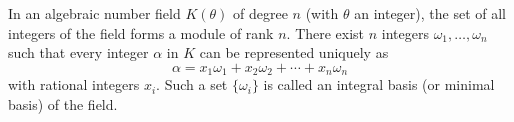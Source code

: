 In an algebraic number field $K(\theta)$ of degree $n$ (with $\theta$ an integer), the set of all integers of the field forms a module of rank $n$. There exist $n$ integers $\omega_1, \ldots, \omega_n$ such that every integer $\alpha$ in $K$ can be represented uniquely as
$$\alpha = x_1 \omega_1 + x_2 \omega_2 + \cdots + x_n \omega_n$$
with rational integers $x_i$. Such a set $\{\omega_i\}$ is called an integral basis (or minimal basis) of the field.
